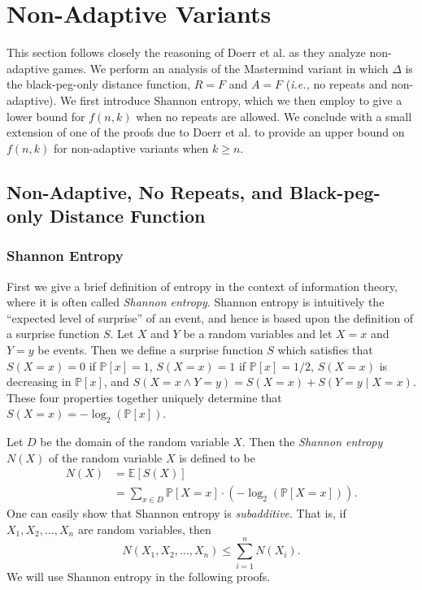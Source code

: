 \documentclass[12pt, a4paper]{article}
\begin{document}
\clearpage
\section{Non-Adaptive Variants}
This section follows closely the reasoning of Doerr et al. \cite{DS13} as they analyze non-adaptive games.  We perform an analysis of the Mastermind variant in which $\Delta$ is the black-peg-only distance function, $R=F$ and $A=F$ (\textit{i.e.,} no repeats and non-adaptive). We first introduce Shannon entropy, which we then employ to give a lower bound for $f(n,k)$ when no repeats are allowed. We conclude with a small extension of one of the proofs due to Doerr et al. to provide an upper bound on $f(n,k)$ for non-adaptive variants when $k\ge n$.
\subsection{Non-Adaptive, No Repeats, and Black-peg-only Distance Function}

\subsubsection{Shannon Entropy}\label{sssec:shannonEntropy}
First we give a brief definition of entropy in the context of information theory, where it is often called \textit{Shannon entropy}. Shannon entropy is intuitively the ``expected level of surprise'' of an event, and hence is based upon the definition of a surprise function $S$. Let $X$ and $Y$ be a random variables and let $X=x$ and $Y=y$ be events. Then we define a surprise function $S$ which satisfies that $S(X=x) = 0$ if $\mathbb{P}[x] = 1$, $S(X=x) = 1$ if $\mathbb{P}[x] = 1/2$, $S(X=x)$ is decreasing in $\mathbb{P}[x]$, and $S(X=x\land Y=y) = S(X=x) + S(Y=y\mid X=x)$. These four properties together uniquely determine that $S(X=x) = -\log_2(\mathbb{P}[x])$.

Let $D$ be the domain of the random variable $X$. Then the \textit{Shannon entropy} $N(X)$ of the random variable $X$ is defined to be
\begin{align*}
	N(X)
	& = \mathbb{E}[S(X)]\\
	& = \sum_{x\in D}\mathbb{P}[X=x]\cdot (-\log_2(\mathbb{P}[X=x])).
\end{align*}
One can easily show that Shannon entropy is \textit{subadditive}. That is, if $X_1, X_2, \ldots, X_n$ are random variables, then
	\begin{equation}\label{subadditivityDefinition}
			N(X_1, X_2, \ldots, X_n)\le \sum_{i=1}^{n}N(X_i).
	\end{equation}
We will use Shannon entropy in the following proofs.
\end{document}
